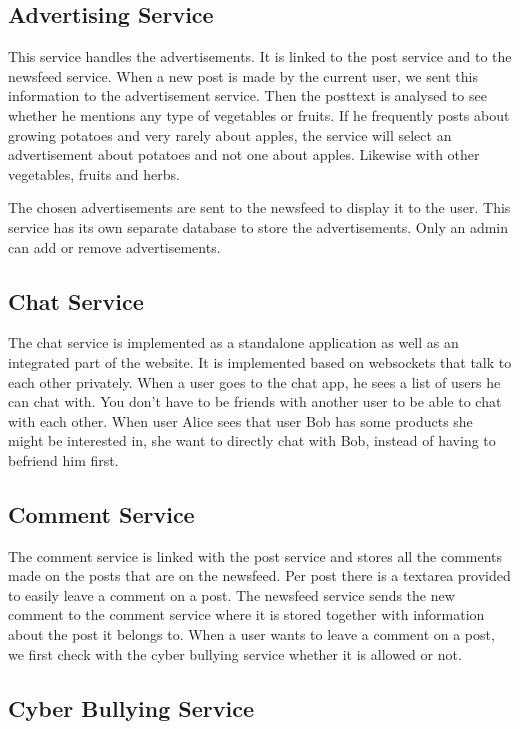 \documentclass[a4paper,12pt]{article}
\begin{document}
\subsection{Advertising Service}

This service handles the advertisements. It is linked to the post service and to the newsfeed service. When a new post is made by the current user, we sent this information to the advertisement service. Then the posttext is analysed to see whether he mentions any type of vegetables or fruits. If he frequently posts about growing potatoes and very rarely about apples, the service will select an advertisement about potatoes and not one about apples. Likewise with other vegetables, fruits and herbs.
\newline

The chosen advertisements are sent to the newsfeed to display it to the user. This service has its own separate database to store the advertisements. Only an admin can add or remove advertisements.

\subsection{Chat Service}

The chat service is implemented as a standalone application as well as an integrated part of the website. It is implemented based on websockets that talk to each other privately. When a user goes to the chat app, he sees a list of users he can chat with. You don't have to be friends with another user to be able to chat with each other. When user Alice sees that user Bob has some products she might be interested in, she want to directly chat with Bob, instead of having to befriend him first.

\subsection{Comment Service}

The comment service is linked with the post service and stores all the comments made on the posts that are on the newsfeed. Per post there is a textarea provided to easily leave a comment on a post. The newsfeed service sends the new comment to the comment service where it is stored together with information about the post it belongs to. When a user wants to leave a comment on a post, we first check with the cyber bullying service whether it is allowed or not. 

\subsection{Cyber Bullying Service}
\end{document}
